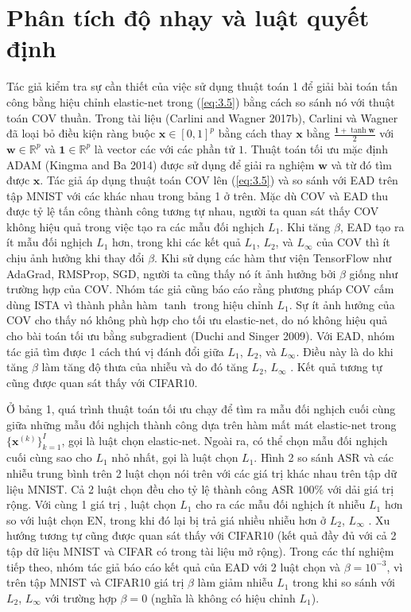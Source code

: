 \section{Phân tích độ nhạy và luật quyết định}
Tác giả kiểm tra sự cần thiết của việc sử dụng thuật toán 1 để giải bài toán tấn công bằng hiệu chỉnh elastic-net trong (\ref{eq:3.5}) bằng cách so sánh nó với thuật toán COV thuần. Trong tài liệu (Carlini and Wagner 2017b), Carlini và Wagner đã loại bỏ điều kiện ràng buộc $\mathbf{x} \in [0,1]^p$ bằng cách thay $\mathbf{x}$ bằng $\frac{\mathbf{1} + \tanh \mathbf{w}}{2}$ với $\mathbf{w} \in \mathbb{R}^p$ và $\mathbf{1} \in \mathbb{R}^p$ là vector các với các phần tử $1$. Thuật toán tối ưu mặc định ADAM (Kingma and Ba 2014) được sử dụng để giải ra nghiệm $\mathbf{w}$ và từ đó tìm được $\mathbf{x}$. Tác giả áp dụng thuật toán COV lên (\ref{eq:3.5}) và so sánh với EAD trên tập MNIST với các  khác nhau trong bảng 1 ở trên. Mặc dù COV và EAD thu được tỷ lệ tấn công thành công tương tự nhau, người ta quan sát thấy COV không hiệu quả trong việc tạo ra các mẫu đối nghịch $L_1$. Khi tăng $\beta$, EAD tạo ra ít mẫu đối nghịch $L_1$ hơn, trong khi các kết quả $L_1$, $L_2$, và $L_{\infty}$ của COV thì ít chịu ảnh hưởng khi thay đổi $\beta$. Khi sử dụng các hàm thư viện TensorFlow như AdaGrad, RMSProp, SGD, người ta cũng thấy nó ít ảnh hưởng bởi $\beta$  giống như trường hợp của COV. Nhóm tác giả cũng báo cáo rằng phương pháp COV cấm dùng ISTA vì thành phần hàm $\tanh$ trong hiệu chỉnh $L_1$. Sự ít ảnh hưởng của COV cho thấy nó không phù hợp cho tối ưu elastic-net, do nó không hiệu quả cho bài toán tối ưu bằng subgradient (Duchi and Singer 2009). Với EAD, nhóm tác giả tìm được 1 cách thú vị đánh đổi giữa $L_1$, $L_2$, và $L_{\infty}$. Điều này là do khi tăng $\beta$ làm tăng độ thưa của nhiễu và do đó tăng $L_2$, $L_{\infty}$ . Kết quả tương tự cũng được quan sát thấy với CIFAR10.

Ở bảng 1, quá trình thuật toán tối ưu chạy để tìm ra mẫu đối nghịch cuối cùng giữa những mẫu đối nghịch thành công dựa trên hàm mất mát elastic-net trong $\{\mathbf{x}^{(k)}\}^I_{k=1}$, gọi là luật chọn elastic-net. Ngoài ra, có thể chọn mẫu đối nghịch cuối cùng sao cho $L_1$ nhỏ nhất, gọi là luật chọn $L_1$. Hình 2 so sánh ASR và các nhiễu trung bình trên 2 luật chọn nói trên với các giá trị  khác nhau trên tập dữ liệu MNIST. Cả 2 luật chọn đều cho tỷ lệ thành công ASR $100\%$ với dải giá trị  rộng. Với cùng 1 giá trị , luật chọn $L_1$ cho ra các mẫu đối nghịch ít nhiễu $L_1$ hơn so với luật chọn EN, trong khi đó lại bị trả giá nhiều nhiễu hơn ở $L_2$, $L_{\infty}$ . Xu hướng tương tự cũng được quan sát thấy với CIFAR10 (kết quả đầy đủ với cả 2 tập dữ liệu MNIST và CIFAR có trong tài liệu mở rộng). Trong các thí nghiệm tiếp theo, nhóm tác giả báo cáo kết quả của EAD với 2 luật chọn và $\beta = 10^{-3}$, vì trên tập MNIST và CIFAR10 giá trị $\beta$ làm giảm nhiễu $L_1$ trong khi so sánh với $L_2$, $L_{\infty}$ với trường hợp $\beta = 0$ (nghĩa là không có hiệu chỉnh $L_1$).

